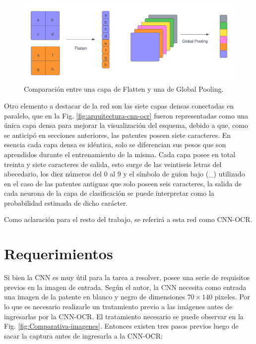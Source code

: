 \begin{figure}[bth]
    \centering
    \includegraphics[width=.8\textwidth]{imgs/flatten-pooling.png}
    \caption{Comparación entre una capa de Flatten y una de Global Pooling.}
    \label{fig:flatten-pooling}
\end{figure}

Otro elemento a destacar de la red son las siete capas densas conectadas en paralelo, que en la Fig. \ref{fig:arquitectura-cnn-ocr} fueron representadas como una única capa densa para mejorar la visualización del esquema, debido a que, como se anticipó en secciones anteriores, las patentes poseen siete caracteres. En esencia cada capa densa es idéntica, solo se diferencian sus pesos que son aprendidos durante el entrenamiento de la misma. Cada capa posee en total treinta y siete caracteres de salida, esto surge de las veintiseis letras del abecedario, los diez números del 0 al 9 y el símbolo de guion bajo (\_) utilizado en el caso de las patentes antiguas que solo poseen seis caracteres, la salida de cada neurona de la capa de clasificación se puede interpretar como la probabilidad estimada de dicho carácter.

Como aclaración para el resto del trabajo, se referirá a esta red como CNN-OCR.

\section{Requerimientos}

Si bien la CNN es muy útil para la tarea a resolver, posee una serie de requisitos previos en la imagen de entrada. Según el autor, la CNN
necesita como entrada una imagen de la patente en blanco y negro de dimensiones $70 \times 140$ pixeles.
Por lo que es necesario realizarle un tratamiento previo a las imágenes antes de ingresarlas por la CNN-OCR. El tratamiento necesario
se puede observar en la Fig. \ref{fig:Comparativa-imagenes}. Entonces existen tres pasos previos luego de sacar
la captura antes de ingresarla a la CNN-OCR:

